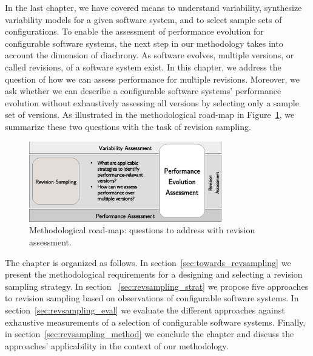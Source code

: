 In the last chapter, we have covered means to understand variability,
synthesize variability models for a given software system, and to select sample
sets of configurations. To enable the assessment of performance evolution for
configurable software systems, the next step in our methodology takes into
account the dimension of diachrony. As software evolves, multiple versions, or
called revisions, of a software system exist. In this chapter, we address the
question of how we can assess performance for multiple revisions. Moreover, we
ask whether we can describe a configurable software systems’ performance
evolution without exhaustively assessing all versions by selecting only a
sample set of versions. As illustrated in the methodological road-map in
Figure~\ref{fig:roadmap_2}, we summarize these two questions with the task of
revision sampling.

\begin{figure}[h!]
	\centering
	\includegraphics[width=0.75\textwidth]{images/process_revassesment.eps}
	\caption{Methodological road-map: questions to address with revision
	assessment.}
	\label{fig:roadmap_2}
\end{figure}

The chapter is organized as follows. In section~\ref{sec:towards_revsampling} we
present the methodological requirements for a designing and selecting a revision sampling
strategy. In section ~\ref{sec:revsampling_strat} we propose five approaches to
revision sampling based on observations of configurable software systems. In
section~\ref{sec:revsampling_eval} we evaluate the different approaches against
exhaustive measurements of a selection of configurable software systems.
Finally, in section~\ref{sec:revsampling_method} we conclude the chapter and
discuss the approaches' applicability in the context of our methodology.

